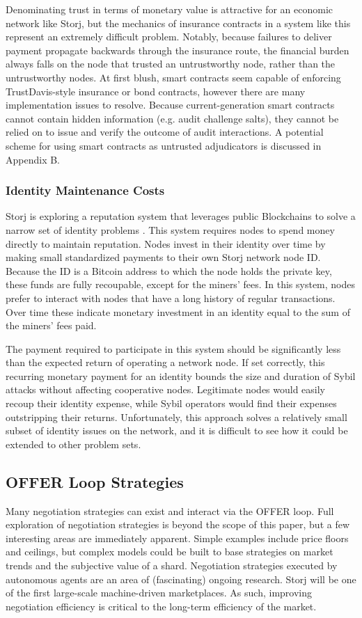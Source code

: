 \documentclass[a4paper,10pt]{article}
\begin{document}
Denominating trust in terms of monetary value is attractive for an economic network like Storj, but the mechanics of insurance contracts in a system like this represent an extremely difficult problem.  Notably, because failures to deliver payment propagate backwards through the insurance route, the financial burden always falls on the node that trusted an untrustworthy node, rather than the untrustworthy nodes. At first blush, smart contracts seem capable of enforcing TrustDavis-style insurance or bond contracts, however there are many implementation issues to resolve. Because current-generation smart contracts cannot contain hidden information (e.g. audit challenge salts), they cannot be relied on to issue and verify the outcome of audit interactions. A potential scheme for using smart contracts as untrusted adjudicators is discussed in Appendix B.

\subsubsection{Identity Maintenance Costs}
Storj is exploring a reputation system that leverages public Blockchains to solve a narrow set of identity problems \cite{23}. This system requires nodes to spend money directly to maintain reputation. Nodes invest in their identity over time by making small standardized payments to their own Storj network node ID. Because the ID is a Bitcoin address to which the node holds the private key, these funds are fully recoupable, except for the miners’ fees. In this system, nodes prefer to interact with nodes that have a long history of regular transactions. Over time these indicate monetary investment in an identity equal to the sum of the miners’ fees paid.

The payment required to participate in this system should be significantly less than the expected return of operating a network node. If set correctly, this recurring monetary payment for an identity bounds the size and duration of Sybil attacks without affecting cooperative nodes. Legitimate nodes would easily recoup their identity expense, while Sybil operators would find their expenses outstripping their returns. Unfortunately, this approach solves a relatively small subset of identity issues on the network, and it is difficult to see how it could be extended to other problem sets.

\subsection{OFFER Loop Strategies}
Many negotiation strategies can exist and interact via the OFFER loop. Full exploration of negotiation strategies is beyond the scope of this paper, but a few interesting areas are immediately apparent. Simple examples include price floors and ceilings, but complex models could be built to base strategies on market trends and the subjective value of a shard. Negotiation strategies executed by autonomous agents are an area of (fascinating) ongoing research. Storj will be one of the first large-scale machine-driven marketplaces. As such, improving negotiation efficiency is critical to the long-term efficiency of the market.
\end{document}
